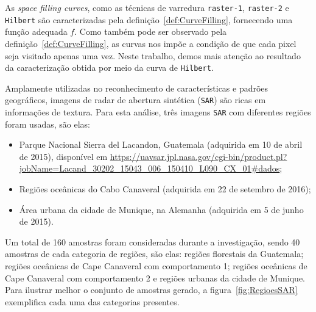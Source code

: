\documentclass[12pt]{article}
\begin{document}
As \textit{space filling curves}, como as técnicas de varredura \texttt{raster-1}, \texttt{raster-2} e \texttt{Hilbert} são caracterizadas pela definição~\ref{def:CurveFilling}, fornecendo uma função adequada $f$. 
Como também pode ser observado pela definição~\ref{def:CurveFilling}, as curvas nos impõe a condição de que cada pixel seja visitado apenas uma vez.
Neste trabalho, demos mais atenção ao resultado da caracterização obtida por meio da curva de \texttt{Hilbert}. 


Amplamente utilizadas no reconhecimento de características e padrões geográficos, imagens de radar de abertura sintética (\texttt{SAR}) são ricas em informações de textura. Para esta análise, três imagens \texttt{SAR} com diferentes regiões foram usadas, são elas:

\begin{itemize}
    \item Parque Nacional Sierra del Lacandon, Guatemala (adquirida em 10 de abril de 2015), disponível em \url{https://uavsar.jpl.nasa.gov/cgi-bin/product.pl?jobName=Lacand_30202_15043_006_150410_L090_CX_01#dados};
    \item Regiões oceânicas do Cabo Canaveral (adquirida em 22 de setembro de 2016);
    \item Área urbana da cidade de Munique, na Alemanha (adquirida em 5 de junho de 2015).
\end{itemize}

Um total de 160 amostras foram consideradas durante a investigação, sendo 40 amostras de cada categoria de regiões, são elas: regiões florestais da Guatemala; regiões oceânicas de Cape Canaveral com comportamento 1; regiões oceânicas de Cape Canaveral com comportamento 2 e regiões urbanas da cidade de Munique. Para ilustrar melhor o conjunto de amostras gerado, a figura~\ref{fig:RegioesSAR} exemplifica cada uma das categorias presentes.
\end{document}
